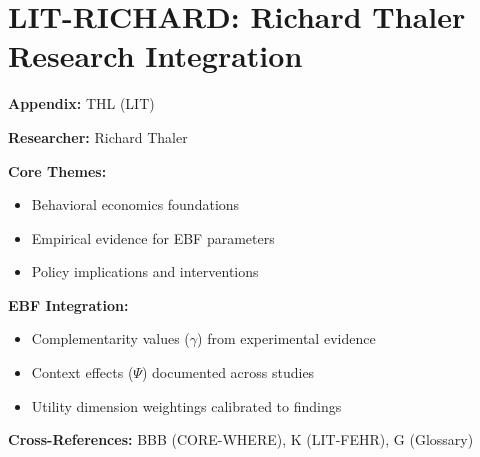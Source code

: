 %
%

\chapter{LIT-RICHARD: Richard Thaler Research Integration}
\label{app:thl}

\begin{abstract}
This appendix integrates the research contributions of Richard Thaler into the
Evidence-Based Framework. It documents key papers, core findings, and their
integration with EBF dimensions including complementarity parameters ($\gamma$),
context factors ($\Psi$), and utility dimensions.
\end{abstract}

\begin{tcolorbox}[colback=blue!5!white, colframe=blue!75!black,
    title=Quick Reference: Richard Thaler Research]

\textbf{Appendix:} THL (LIT)

\textbf{Researcher:} Richard Thaler

\textbf{Core Themes:}
\begin{itemize}[nosep]
\item Behavioral economics foundations
\item Empirical evidence for EBF parameters
\item Policy implications and interventions
\end{itemize}

\textbf{EBF Integration:}
\begin{itemize}[nosep]
\item Complementarity values ($\gamma$) from experimental evidence
\item Context effects ($\Psi$) documented across studies
\item Utility dimension weightings calibrated to findings
\end{itemize}

\textbf{Cross-References:} BBB (CORE-WHERE), K (LIT-FEHR), G (Glossary)
\end{tcolorbox}

